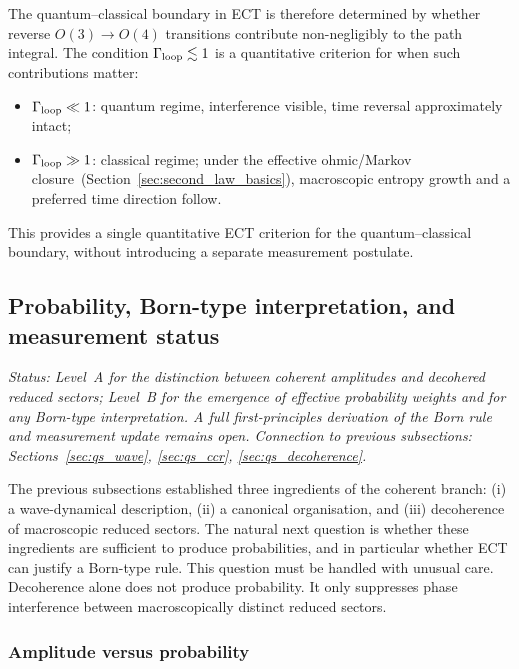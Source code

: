 \documentclass[11pt,a4paper]{article}
\numberwithin{equation}{section}
\begin{document}
The quantum--classical boundary in ECT is therefore determined by
whether reverse $O(3)\!\to\!O(4)$ transitions contribute
non-negligibly to the path integral.
The condition $\Gamma_{\rm loop} \lesssim 1$ is a quantitative
criterion for when such contributions matter:
\begin{itemize}
  \item $\Gamma_{\rm loop} \ll 1$: quantum regime, interference
  visible, time reversal approximately intact;
  \item $\Gamma_{\rm loop} \gg 1$: classical regime; under the
  effective ohmic/Markov closure~(Section~\ref{sec:second_law_basics}),
  macroscopic entropy growth and a preferred time direction follow.
\end{itemize}
This provides a single quantitative ECT criterion for the
quantum--classical boundary, without introducing a
separate measurement postulate.

\subsection{Probability, Born-type interpretation, and measurement status}
\label{sec:qs_born}\label{sec:born_rule}

\textit{Status: Level~A for the distinction between coherent amplitudes
and decohered reduced sectors; Level~B for the emergence of effective
probability weights and for any Born-type interpretation.
A full first-principles derivation of the Born rule and measurement
update remains open.
Connection to previous subsections:
Sections~\ref{sec:qs_wave}, \ref{sec:qs_ccr},
\ref{sec:qs_decoherence}.}

\medskip
The previous subsections established three ingredients of the coherent
branch: (i) a wave-dynamical description, (ii) a canonical
organisation, and (iii) decoherence of macroscopic reduced sectors.
The natural next question is whether these ingredients are sufficient
to produce probabilities, and in particular whether ECT can justify a
Born-type rule.
This question must be handled with unusual care.
Decoherence alone does not produce probability.
It only suppresses phase interference between macroscopically distinct
reduced sectors.

\subsubsection*{Amplitude versus probability}
\end{document}
